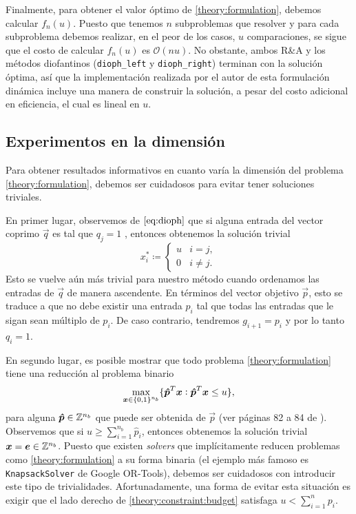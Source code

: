 Finalmente, para obtener el valor óptimo de \eqref{theory:formulation}, debemos calcular $f_n(u)$.
Puesto que tenemos $n$ subproblemas que resolver y para cada subproblema debemos realizar, en el
peor de los casos, $u$ comparaciones, se sigue que el costo de calcular $f_n(u)$ es $\mathcal{O}(nu)$.
No obstante, ambos R\&A y los métodos diofantinos (\texttt{dioph\_left} y
\texttt{dioph\_right}) terminan con la solución óptima, así que la implementación realizada por el
autor de esta formulación dinámica incluye una manera de construir la solución, a pesar del costo
adicional en eficiencia, el cual es lineal en $u$.

\subsection{Experimentos en la dimensión}
\label{subsec:exp:fin:n}
\noindent
Para obtener resultados informativos en cuanto varía la dimensión del problema
\eqref{theory:formulation}, debemos ser cuidadosos para evitar tener soluciones triviales.

En primer lugar, observemos de $\eqref{eq:dioph}$ que si alguna entrada del vector coprimo $\vec{q}$
es tal que $q_j = 1$ , entonces obtenemos la solución trivial
\begin{equation*}
	x_i^* \coloneq \begin{cases}
		u & i = j, \\
		0 & i \neq j.
	\end{cases}
\end{equation*}
Esto se vuelve aún más trivial para nuestro método cuando ordenamos las entradas de $\vec{q}$ de
manera ascendente. En términos del vector objetivo $\vec{p}$, esto se traduce a que no debe existir una
entrada $p_i$ tal que todas las entradas que le sigan sean múltiplo de $p_i$. De caso contrario,
tendremos $g_{i + 1} = p_i$ y por lo tanto $q_i = 1$.

En segundo lugar, es posible mostrar que todo problema \eqref{theory:formulation} tiene una
reducción al problema binario
\begin{equation*}
	\max_{\boldsymbol{x} \in \lbrace 0, 1 \rbrace^{n_b}} \lbrace  \boldsymbol{\hat{p}}^T\boldsymbol{x} \vcentcolon \boldsymbol{\hat{p}}^T\boldsymbol{x} \leq
	u \rbrace,
\end{equation*}
para alguna $\boldsymbol{\hat{p}} \in \mathbb{Z}^{n_b}$ que puede ser obtenida de $\vec{p}$ (ver páginas 82 a 84 de \cite{martello}).
Observemos que si $u \geq \sum_{i=1}^{n_b}\hat{p}_i$, entonces obtenemos la solución trivial
$\boldsymbol{x} = \boldsymbol{e} \in \mathbb{Z}^{n_b}$. Puesto que existen \textit{solvers} que implícitamente reducen
problemas como \eqref{theory:formulation} a su forma binaria (el ejemplo más famoso es
\texttt{KnapsackSolver} de Google OR-Tools), debemos ser cuidadosos con introducir este tipo de
trivialidades. Afortunadamente, una forma de evitar esta situación es exigir que el lado derecho de
\eqref{theory:constraint:budget} satisfaga $u < \sum_{i=1}^{n}p_i$.


